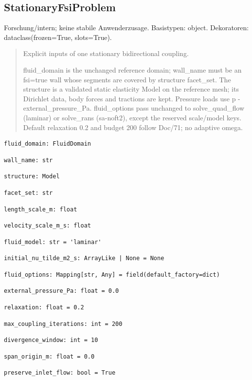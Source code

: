 \subsection{StationaryFsiProblem}
Forschung/intern; keine stabile Anwenderzusage.
Basistypen: object. Dekoratoren: dataclass(frozen=True, slots=True).
\begin{quote}
Explicit inputs of one stationary bidirectional coupling.\par fluid\_domain is the unchanged reference domain; wall\_name must be an fsi=true wall whose segments are covered by structure facet\_set. The structure is a validated static elasticity Model on the reference mesh; its Dirichlet data, body forces and tractions are kept. Pressure loads use p - external\_pressure\_Pa. fluid\_options pass unchanged to solve\_quad\_flow (laminar) or solve\_rans (sa-noft2), except the reserved scale/model keys. Default relaxation 0.2 and budget 200 follow Doc/71; no adaptive omega.
\end{quote}
\begin{lstlisting}
fluid_domain: FluidDomain
\end{lstlisting}
\begin{lstlisting}
wall_name: str
\end{lstlisting}
\begin{lstlisting}
structure: Model
\end{lstlisting}
\begin{lstlisting}
facet_set: str
\end{lstlisting}
\begin{lstlisting}
length_scale_m: float
\end{lstlisting}
\begin{lstlisting}
velocity_scale_m_s: float
\end{lstlisting}
\begin{lstlisting}
fluid_model: str = 'laminar'
\end{lstlisting}
\begin{lstlisting}
initial_nu_tilde_m2_s: ArrayLike | None = None
\end{lstlisting}
\begin{lstlisting}
fluid_options: Mapping[str, Any] = field(default_factory=dict)
\end{lstlisting}
\begin{lstlisting}
external_pressure_Pa: float = 0.0
\end{lstlisting}
\begin{lstlisting}
relaxation: float = 0.2
\end{lstlisting}
\begin{lstlisting}
max_coupling_iterations: int = 200
\end{lstlisting}
\begin{lstlisting}
divergence_window: int = 10
\end{lstlisting}
\begin{lstlisting}
span_origin_m: float = 0.0
\end{lstlisting}
\begin{lstlisting}
preserve_inlet_flow: bool = True
\end{lstlisting}
